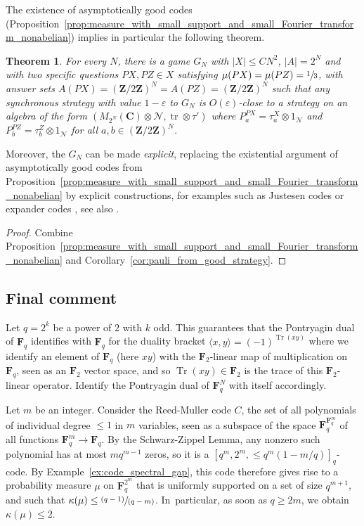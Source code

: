 \documentclass[10pt]{amsart}
\newcommand{\pspfrac}[2]{\sfrac{(#1)}{(#2)}}
\theoremstyle{plain}
\newtheorem{theorem}{Theorem}[section]
\theoremstyle{definition}
\newcommand{\C}{\mathbf{C}}
\newcommand{\Z}{\mathbf{Z}}
\newcommand{\cN}{\mathcal{N}}
\newcommand{\F}{\mathbf{F}}
\DeclareMathOperator{\tr}{tr}
\DeclareMathOperator{\Tr}{Tr}
\begin{document}
The existence of asymptotically good codes (Proposition~\ref{prop:measure_with_small_support_and_small_Fourier_transform_nonabelian}) implies in particular the following theorem.


\begin{theorem}\label{thm:mainTheorem}
For every $N$, there is a game $G_N$ with $|X|\leq C N^2$, $|A|=2^N$ and with two specific questions $PX,PZ \in X$ satisfying $\mu(PX)=\mu(PZ) = \sfrac 1 3$, with answer sets $A(PX)=(\Z/2\Z)^N = A(PZ)=(\Z/2\Z)^N$ such that any synchronous strategy with value $1-\varepsilon$ to $G_N$ is $O(\varepsilon)$-close to a strategy on an algebra of the form $(M_{2^N}(\C)\otimes \cN,\mathrm{\tr}\otimes \tau')$ where $P^{PX}_a = \tau^X_a\otimes 1_\cN$ and $P^{PZ}_b = \tau^Z_b\otimes 1_\cN$ for all $a,b\in (\Z/2\Z)^N$.
\end{theorem}

Moreover, the $G_N$ can be made \emph{explicit}, replacing the existential argument of asymptotically good codes from Proposition~\ref{prop:measure_with_small_support_and_small_Fourier_transform_nonabelian} by explicit constructions, for examples such as Justesen codes \cite{MR0465509} or expander codes \cite{MR2494807}, see also \cite{MR1996953}.
\begin{proof} Combine Proposition~\ref{prop:measure_with_small_support_and_small_Fourier_transform_nonabelian} and Corollary~\ref{cor:pauli_from_good_strategy}.
\end{proof}

\subsection{Final comment}\label{subsection:comparison}
Let $q=2^k$ be a power of $2$ with $k$ odd. This guarantees that the Pontryagin dual of $\F_q$ identifies with $\F_q$ for the duality bracket $\langle x,y\rangle = (-1)^{\Tr(xy)}$ where we identify an element of $\F_q$ (here $xy$) with the $\F_2$-linear map of multiplication on $\F_q$, seen as an $\F_2$ vector space, and so $\Tr(xy) \in \F_2$ is the trace of this $\F_2$-linear operator. Identify the Pontryagin dual of $\F_q^N$ with itself accordingly.

Let $m$ be an integer. Consider the Reed-Muller code $C$, the set of all polynomials of individual degree $\leq 1$ in $m$ variables, seen as a subspace of the space $\F_q^{\F_q^m}$ of all functions $\F_q^m\to \F_q$. By the Schwarz-Zippel Lemma, any nonzero such polynomial has at most $mq^{m-1}$ zeros, so it is a $[q^m,2^m,\leq q^m(1-m/q)]_q$-code. By Example~\ref{ex:code_spectral_gap}, this code therefore gives rise to a probability measure $\mu$ on $\F_q^{2^m}$ that is uniformly supported on a set of size $q^{m+1}$, and such that $\kappa(\mu) \leq \pspfrac{q-1}{q-m}$. In~particular, as soon as $q \geq 2m$, we obtain $\kappa(\mu) \leq 2$.
\end{document}
